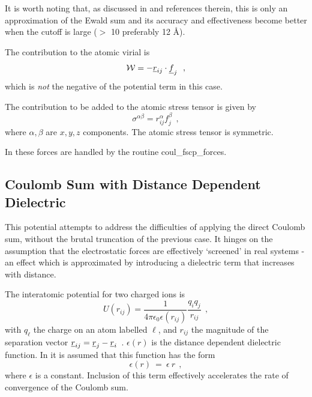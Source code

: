 It is worth noting that, as discussed in \cite{fennell-06} and
references therein, this is only an approximation of the Ewald
sum and its accuracy and effectiveness become better when the
cutoff is large ($>$ 10 preferably 12 \AA).

The contribution to the atomic virial is
\begin{equation}
{\cal W} = -\mbox{$\underline{r}$}_{ij} \cdot \mbox{$\underline{f}$}_{j}~~,
\end{equation}
which is {\em not} the negative of the potential term in this case.

The contribution to be added to the atomic stress
tensor is given by
\begin{equation}
\sigma^{\alpha \beta} = r_{ij}^{\alpha} f_{j}^{\beta}~~,
\end{equation}
where $\alpha,\beta$ are $x,y,z$ components.  The atomic stress
tensor is symmetric.

In \D these forces are handled by the routine {\sc coul\_fscp\_forces}.

\subsection{Coulomb Sum with Distance Dependent Dielectric}

This potential attempts to address the difficulties of applying
the direct Coulomb sum, without the
brutal truncation of the previous case.  It hinges on the
assumption that the electrostatic forces are effectively
`screened' in real systems - an effect which is approximated by
introducing a dielectric term that increases with distance.

The interatomic potential for two charged ions is
\begin{equation}
U(r_{ij}) = \frac{1}{4\pi\epsilon_{0}\epsilon(r_{ij})} \frac{q_{i}q_{j}}{r_{ij}}~~,
\end{equation}
with $q_{\ell}$ the charge on an atom labelled $\ell$, and
$r_{ij}$ the magnitude of the separation vector
$\mbox{$\underline{r}$}_{ij}=\mbox{$\underline{r}$}_{j}-\mbox{$\underline{r}$}_{i}$~.  $\epsilon(r)$ is the
distance dependent dielectric
function.  In \D it is assumed that this function has the form
\begin{equation}
\epsilon(r)~=~\epsilon~r~~,
\end{equation}
where $\epsilon$ is a constant.  Inclusion of this term
effectively accelerates the rate of convergence of the Coulomb
sum.

